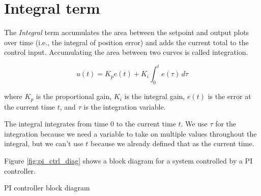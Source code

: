 \section{Integral term}

The \textit{Integral} term accumulates the area between the \gls{setpoint}
and \gls{output} plots over time (i.e., the integral of position \gls{error})
and adds the current total to the \gls{control input}. Accumulating the area
between two curves is called integration.

\begin{definition}[PI controller]
  \begin{equation}
    u(t) = K_p e(t) + K_i \int_0^t e(\tau) \,d\tau
  \end{equation}

  where $K_p$ is the proportional gain, $K_i$ is the integral gain, $e(t)$ is
  the error at the current time $t$, and $\tau$ is the integration variable.

  The integral integrates from time $0$ to the current time $t$. We use $\tau$
  for the integration because we need a variable to take on multiple values
  throughout the integral, but we can't use $t$ because we already defined that
  as the current time.
\end{definition}

Figure \ref{fig:pi_ctrl_diag} shows a block diagram for a \gls{system}
controlled by a PI controller.

\begin{bookfigure}

  \caption{PI controller block diagram}
  \label{fig:pi_ctrl_diag}
\end{bookfigure}

